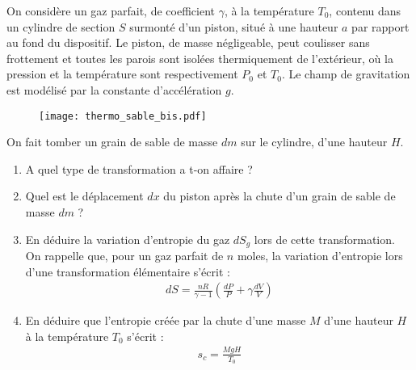 On considère un gaz parfait, de coefficient $\gamma$, à la température $T_0$, contenu dans un cylindre de section $S$ surmonté d'un piston, situé à une hauteur $a$ par rapport au fond du dispositif. Le piston, de masse négligeable, peut coulisser sans frottement et toutes les parois sont isolées thermiquement de l'extérieur, où la pression et la température sont respectivement $P_0$ et $T_0$. Le champ de gravitation est modélisé par la constante d'accélération $g$.

\begin{figure}[h!]
\centering
  \texttt{[image: thermo\_sable\_bis.pdf]}
\end{figure}

On fait tomber un grain de sable de masse $dm$ sur le cylindre, d'une hauteur $H$.

\begin{enumerate}

\item A quel type de transformation a t-on affaire ?

\item Quel est le déplacement $dx$ du piston après la chute d'un grain de sable de masse $dm$ ?

\item En déduire la variation d'entropie du gaz $dS_g$ lors de cette transformation. On rappelle que, pour un gaz parfait de $n$ moles, la variation d'entropie lors d'une transformation élémentaire s'écrit :
\begin{align*}
	dS=\frac{nR}{\gamma-1}\left(\frac{dP}{P}+\gamma\frac{dV}{V} \right) 
\end{align*}

\item En déduire que l'entropie créée par la chute d'une masse $M$ d'une hauteur $H$ à la température $T_0$ s'écrit :
\begin{align*}
	s_c=\frac{MgH}{T_0}
\end{align*} 

\end{enumerate}

\newpage

